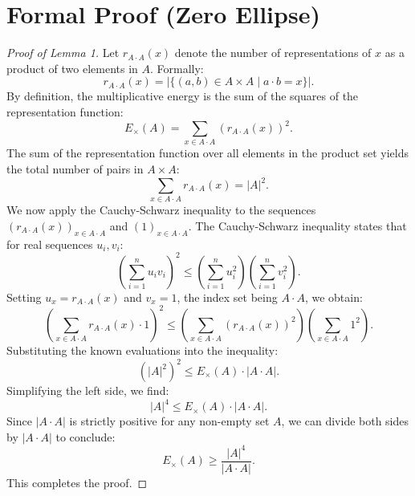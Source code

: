 \documentclass[11pt,a4paper]{article}
\begin{document}
\section{Formal Proof (Zero Ellipse)}
\begin{proof}[Proof of Lemma 1]
Let $r_{A \cdot A}(x)$ denote the number of representations of $x$ as a product of two elements in $A$. Formally:
\begin{equation}
r_{A \cdot A}(x) = |\{(a,b) \in A \times A \mid a \cdot b = x\}|.
\end{equation}
By definition, the multiplicative energy is the sum of the squares of the representation function:
\begin{equation}
E_{\times}(A) = \sum_{x \in A \cdot A} (r_{A \cdot A}(x))^2.
\end{equation}
The sum of the representation function over all elements in the product set yields the total number of pairs in $A \times A$:
\begin{equation}
\sum_{x \in A \cdot A} r_{A \cdot A}(x) = |A|^2.
\end{equation}
We now apply the Cauchy-Schwarz inequality to the sequences $(r_{A \cdot A}(x))_{x \in A \cdot A}$ and $(1)_{x \in A \cdot A}$.
The Cauchy-Schwarz inequality states that for real sequences $u_i, v_i$:
\begin{equation}
\left( \sum_{i=1}^{n} u_i v_i \right)^2 \leq \left( \sum_{i=1}^{n} u_i^2 \right) \left( \sum_{i=1}^{n} v_i^2 \right).
\end{equation}
Setting $u_x = r_{A \cdot A}(x)$ and $v_x = 1$, the index set being $A \cdot A$, we obtain:
\begin{equation}
\left( \sum_{x \in A \cdot A} r_{A \cdot A}(x) \cdot 1 \right)^2 \leq \left( \sum_{x \in A \cdot A} (r_{A \cdot A}(x))^2 \right) \left( \sum_{x \in A \cdot A} 1^2 \right).
\end{equation}
Substituting the known evaluations into the inequality:
\begin{equation}
(|A|^2)^2 \leq E_{\times}(A) \cdot |A \cdot A|.
\end{equation}
Simplifying the left side, we find:
\begin{equation}
|A|^4 \leq E_{\times}(A) \cdot |A \cdot A|.
\end{equation}
Since $|A \cdot A|$ is strictly positive for any non-empty set $A$, we can divide both sides by $|A \cdot A|$ to conclude:
\begin{equation}
E_{\times}(A) \geq \frac{|A|^4}{|A \cdot A|}.
\end{equation}
This completes the proof.
\end{proof}
\end{document}
